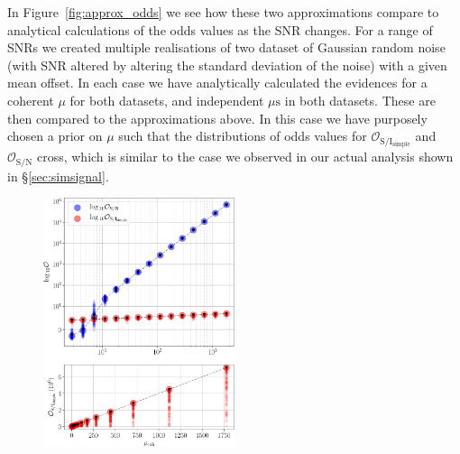 In Figure~\ref{fig:approx_odds} we see how these two approximations compare to analytical calculations of the odds values as the SNR changes. For a range of SNRs
we created multiple realisations of two dataset of Gaussian random noise (with SNR altered by altering the standard deviation of the noise) with a given
mean offset. In each case we have analytically calculated the evidences for a coherent $\mu$ for both datasets, and independent $\mu\text{s}$ in both datasets.
These are then compared to the approximations above. In this case we have purposely chosen a prior on $\mu$ such that the distributions of odds values for
$\mathcal{O}_{\text{S}/\text{I}_{\text{simple}}}$ and $\mathcal{O}_{\text{S}/\text{N}}$ cross, which is similar to the case we observed in our actual analysis shown in \S\ref{sec:simsignal}.

\begin{figure}[!phtb]
\begin{center}
\includegraphics[width=0.5\textwidth]{./figures/appendix4/approx_odds}
\caption{ \protect}
\end{center}
\end{figure}
